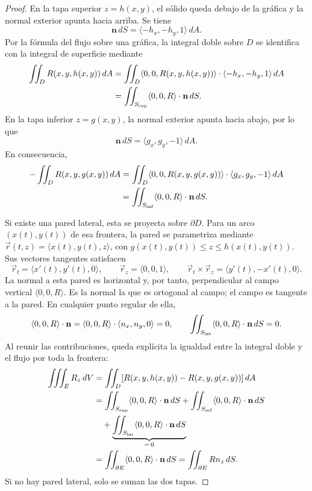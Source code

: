 \begin{proof}
En la tapa superior $z=h(x,y)$, el sólido queda debajo de la gráfica y la normal exterior apunta hacia arriba. Se tiene
\[
\mathbf n\,dS=\langle-h_x,-h_y,1\rangle\,dA.
\]
Por la fórmula del flujo sobre una gráfica, la integral doble sobre $D$ se identifica con la integral de superficie mediante
\begin{align*}
\iint_D R(x,y,h(x,y))\,dA
&=\iint_D\langle0,0,R(x,y,h(x,y))\rangle
\cdot\langle-h_x,-h_y,1\rangle\,dA\\
&=\iint_{S_{\rm sup}}\langle0,0,R\rangle\cdot\mathbf n\,dS.
\end{align*}
En la tapa inferior $z=g(x,y)$, la normal exterior apunta hacia abajo, por lo que
\[
\mathbf n\,dS=\langle g_x,g_y,-1\rangle\,dA.
\]
En consecuencia,
\begin{align*}
-\iint_D R(x,y,g(x,y))\,dA
&=\iint_D\langle0,0,R(x,y,g(x,y))\rangle
\cdot\langle g_x,g_y,-1\rangle\,dA\\
&=\iint_{S_{\rm inf}}\langle0,0,R\rangle\cdot\mathbf n\,dS.
\end{align*}

Si existe una pared lateral, esta se proyecta sobre $\partial D$. Para un arco $(x(t),y(t))$ de esa frontera, la pared se parametriza mediante $\vec r(t,z)=\langle x(t),y(t),z\rangle$, con $g(x(t),y(t))\leq z\leq h(x(t),y(t))$. Sus vectores tangentes satisfacen
\[
\vec r_t=\langle x'(t),y'(t),0\rangle,
\qquad \vec r_z=\langle0,0,1\rangle,
\qquad \vec r_t\times\vec r_z=\langle y'(t),-x'(t),0\rangle.
\]
La normal a esta pared es horizontal y, por tanto, perpendicular al campo vertical $\langle0,0,R\rangle$. Es la normal la que es ortogonal al campo; el campo es tangente a la pared. En cualquier punto regular de ella,
\[
\langle0,0,R\rangle\cdot\mathbf n
=\langle0,0,R\rangle\cdot\langle n_x,n_y,0\rangle=0,
\qquad
\iint_{S_{\rm lat}}\langle0,0,R\rangle\cdot\mathbf n\,dS=0.
\]
Al reunir las contribuciones, queda explícita la igualdad entre la integral doble y el flujo por toda la frontera:
\begin{align*}
\iiint_E R_z\,dV
&=\iint_D[R(x,y,h(x,y))-R(x,y,g(x,y))]\,dA\\
&=\iint_{S_{\rm sup}}\langle0,0,R\rangle\cdot\mathbf n\,dS
 +\iint_{S_{\rm inf}}\langle0,0,R\rangle\cdot\mathbf n\,dS\\
&\quad+\underbrace{\iint_{S_{\rm lat}}\langle0,0,R\rangle\cdot\mathbf n\,dS}_{=\,0}\\
&=\iint_{\partial E}\langle0,0,R\rangle\cdot\mathbf n\,dS
=\iint_{\partial E}R n_z\,dS.
\end{align*}
Si no hay pared lateral, solo se suman las dos tapas.


\end{proof}
